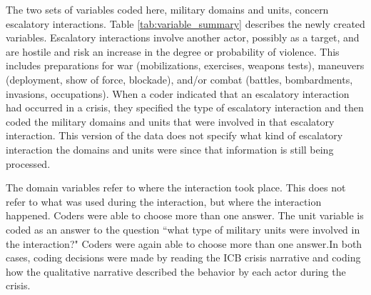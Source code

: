 \documentclass[12pt,letterpaper]{article}
\begin{document}
		The two sets of variables coded here, military domains and units, concern escalatory interactions. Table \ref{tab:variable_summary} describes the newly created variables. Escalatory interactions involve another actor, possibly as a target, and are hostile and risk an increase in the degree or probability of violence. This includes preparations for war (mobilizations, exercises, weapons tests), maneuvers (deployment, show of force, blockade), and/or combat (battles, bombardments, invasions, occupations). When a coder indicated that an escalatory interaction had occurred in a crisis, they specified the type of escalatory interaction and then coded the military domains and units that were involved in that escalatory interaction. This version of the data does not specify what kind of escalatory interaction the domains and units were since that information is still being processed.
		
		The domain variables refer to where the interaction took place. This does not refer to what was used during the interaction, but where the interaction happened. Coders were able to choose more than one answer. The unit variable is coded as an answer to the question ``what type of military units were involved in the interaction?" Coders were again able to choose more than one answer.In both cases, coding decisions were made by reading the ICB crisis narrative and coding how the qualitative narrative described the behavior by each actor during the crisis.
		
\end{document}
